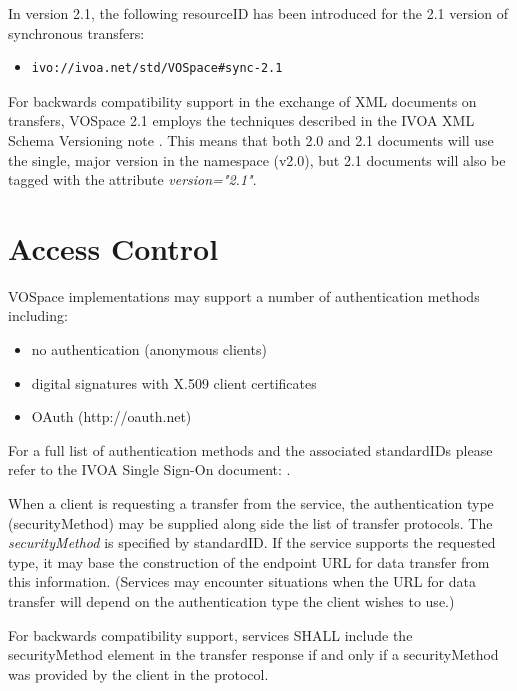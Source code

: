 \documentclass[11pt,a4paper]{ivoa}
\begin{document}
In version 2.1, the following resourceID has been introduced for the 2.1 version of synchronous transfers:

\begin{itemize}
    \item \begin{verbatim}ivo://ivoa.net/std/VOSpace#sync-2.1\end{verbatim}
\end{itemize}

For backwards compatibility support in the exchange of XML documents on transfers, VOSpace 2.1 employs the techniques described in the IVOA XML Schema Versioning note \citep{note:schemaversioning}.  This means that both 2.0 and 2.1 documents will use the single, major version in the namespace (v2.0), but 2.1 documents will also be tagged with the attribute \emph{version="2.1"}.

\section{Access Control}
\label{sec:access control}
VOSpace implementations may support a number of authentication methods including:

\begin{itemize}
    \item no authentication (anonymous clients)
    \item digital signatures with X.509 client certificates
    \item OAuth (http://oauth.net)
\end{itemize}

For a full list of authentication methods and the associated standardIDs please refer to the IVOA Single Sign-On document: \citep{std:SSOAUTH2}. 	

When a client is requesting a transfer from the service, the authentication type (securityMethod) may be supplied along side the list of transfer protocols. The \emph{securityMethod} is specified by standardID.  If the service supports the requested type, it may base the construction of the endpoint URL for data transfer from this information.  (Services may encounter situations when the URL for data transfer will depend on the authentication type the client wishes to use.)

For backwards compatibility support, services SHALL include the securityMethod element in the transfer response if and only if a securityMethod was provided by the client in the protocol.
\end{document}
